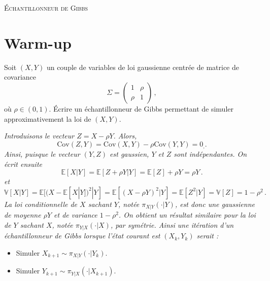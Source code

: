 \documentclass[a4paper,10pt,fleqn]{article}
\newcommand{\1}{\ensuremath{\mathbbm{1}}}
\begin{document}

\noindent\hrulefill

\begin{center}
\textsc{\'Echantillonneur de Gibbs}
\end{center}
\hrulefill

\medskip


\section*{Warm-up}
Soit $(X,Y)$ un couple de variables de loi gaussienne centr\'ee de matrice de covariance 
$$
\Sigma = \begin{pmatrix}
1 & \rho\\ \rho & 1
\end{pmatrix}\,,
$$
o\`u $\rho \in(0,1)$. 
\'Ecrire un \'echantillonneur de Gibbs permettant de simuler approximativement la loi de $(X,Y)$.

\vspace{.2cm}

{\em
Introduisons le vecteur $Z = X-\rho Y$. Alors, 
$$
\mathrm{Cov}(Z,Y) = \mathrm{Cov}(X,Y) - \rho\mathrm{Cov}(Y,Y) = 0_,.
$$
Ainsi, puisque le vecteur $(Y,Z)$ est gaussien, $Y$ et $Z$ sont ind\'ependantes. On \'ecrit ensuite 
$$
\mathbb{E}[X|Y] = \mathbb{E}[Z+\rho Y|Y] = \mathbb{E}[Z] +\rho Y = \rho Y\,.
$$
et
$$
\mathbb{V}[X|Y] = \mathbb{E}[(X- \mathbb{E}[X|Y])^2|Y] =\mathbb{E}[(X- \rho Y)^2|Y] = \mathbb{E}[Z^2|Y] = \mathbb{V}[Z] = 1-\rho^2\,.
$$
La loi conditionnelle de $X$ sachant $Y$, not\'ee $\pi_{X|Y}(\cdot |Y)$, est donc une gaussienne de moyenne $\rho Y$ et de variance $1-\rho^2$. On obtient un r\'esultat similaire pour la loi de $Y$ sachant $X$, not\'ee $\pi_{Y|X}(\cdot |X)$, par sym\'etrie. Ainsi une it\'eration d'un \'echantillonneur de Gibbs  lorsque l'\'etat courant est $(X_k,Y_k)$ serait :
\begin{itemize}
\item Simuler $X_{k+1} \sim \pi_{X|Y}(\cdot |Y_k)$.
\item Simuler $Y_{k+1} \sim \pi_{Y|X}(\cdot |X_{k+1})$.
\end{itemize}
}
\end{document}
